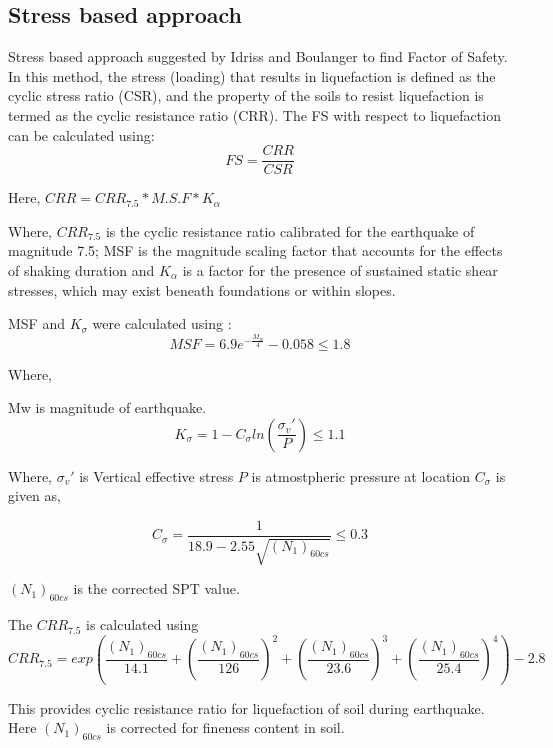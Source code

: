\subsection{Stress based approach}
Stress based approach suggested by Idriss and Boulanger \cite{idris_and_bolinger} to find Factor of Safety. In this method, the stress (loading) that results in liquefaction is defined as the cyclic stress ratio (CSR), and the property of the soils to resist liquefaction is termed as the cyclic resistance ratio (CRR). The FS with respect to liquefaction can be calculated using:
\begin{equation}
FS = \frac{CRR}{CSR}
\end{equation}

Here, $CRR = CRR_{7.5}*M.S.F*K_\alpha $

Where, $CRR_{7.5}$ is the cyclic resistance ratio calibrated for the earthquake of magnitude 7.5; MSF is the magnitude scaling factor that accounts for the effects of shaking duration and $K_\alpha$ is a factor for the presence of sustained static shear stresses, which may exist beneath foundations or within slopes.

MSF and $K_\sigma$ were calculated using \cite{idris_and_bolinger}: 
\begin{equation}
MSF = 6.9 e^{- \frac{M_w}{4}} - 0.058 \leq 1.8
\end{equation}

Where,

Mw is magnitude of earthquake.
\begin{equation}
K_\sigma = 1 - C_\sigma ln (\frac{\sigma_v'}{P}) \leq 1.1
\end{equation}

Where,
$\sigma_v'$ is Vertical effective stress
$P$ is atmostpheric pressure at location
$C_\sigma$ is given as,

\begin{equation}
C_\sigma = \frac{1}{18.9-2.55\sqrt{({N_1})_{60cs}}} \leq 0.3
\end{equation}

$({N_1})_{60cs}$ is the corrected SPT value.

The $CRR_{7.5}$ is calculated using \cite{idris_and_bolinger}
\begin{equation}
CRR_{7.5} = exp(\frac{({N_1})_{60cs}}{14.1} + (\frac{({N_1})_{60cs}}{126})^2 + (\frac{({N_1})_{60cs}}{23.6})^3 + (\frac{({N_1})_{60cs}}{25.4})^4) - 2.8
\end{equation}

This provides cyclic resistance ratio for liquefaction of soil during earthquake. Here $({N_1})_{60cs}$ is corrected for fineness content in soil.

